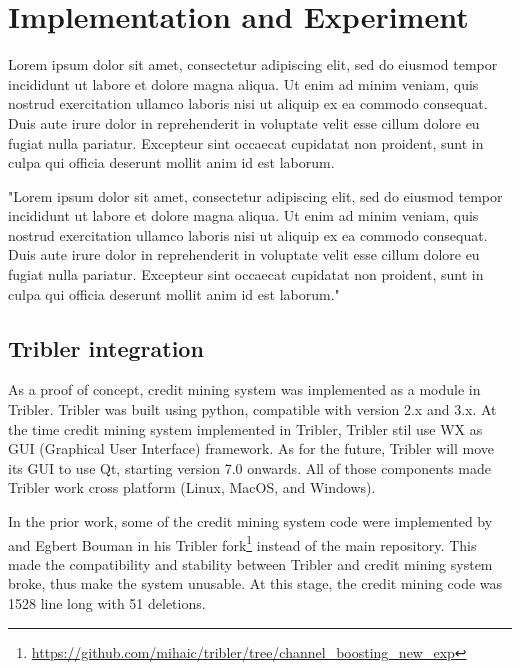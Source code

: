\chapter{Implementation and Experiment}
\label{chp:implexperiment}
Lorem ipsum dolor sit amet, consectetur adipiscing elit, sed do eiusmod tempor incididunt ut labore et dolore magna aliqua. Ut enim ad minim veniam, quis nostrud exercitation ullamco laboris nisi ut aliquip ex ea commodo consequat. Duis aute irure dolor in reprehenderit in voluptate velit esse cillum dolore eu fugiat nulla pariatur. Excepteur sint occaecat cupidatat non proident, sunt in culpa qui officia deserunt mollit anim id est laborum.

"Lorem ipsum dolor sit amet, consectetur adipiscing elit, sed do eiusmod tempor incididunt ut labore et dolore magna aliqua. Ut enim ad minim veniam, quis nostrud exercitation ullamco laboris nisi ut aliquip ex ea commodo consequat. Duis aute irure dolor in reprehenderit in voluptate velit esse cillum dolore eu fugiat nulla pariatur. Excepteur sint occaecat cupidatat non proident, sunt in culpa qui officia deserunt mollit anim id est laborum."


\section{Tribler integration}
As a proof of concept, credit mining system was implemented as a module in Tribler. Tribler was built using python, compatible with version 2.x and 3.x. At the time credit mining system implemented in Tribler, Tribler stil use WX as GUI (Graphical User Interface) framework. As for the future, Tribler will move its GUI to use Qt, starting version 7.0 onwards. All of those components made Tribler work cross platform (Linux, MacOS, and Windows).

In the prior work, some of the credit mining system code were implemented by \citeauthor{2015:creditmining:capota} and Egbert Bouman in his Tribler fork\footnote{\url{https://github.com/mihaic/tribler/tree/channel_boosting_new_exp}} instead of the main repository. This made the compatibility and stability between Tribler and credit mining system broke, thus make the system unusable. At this stage, the credit mining code was 1528 line long with 51 deletions.

